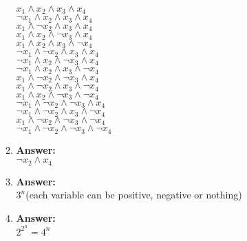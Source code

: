 \documentclass[12pt, fullpage,letterpaper]{article}
\begin{document}
\begin{enumerate}
\begin{enumerate}
\begin{multicols}{3}
$x_1 \wedge x_2 \wedge x_3 \wedge x_4$\\
$\neg x_1 \wedge x_2 \wedge x_3 \wedge x_4$\\
$x_1 \wedge \neg x_2 \wedge x_3 \wedge x_4$\\
$x_1 \wedge x_2 \wedge \neg x_3 \wedge x_4$\\
$x_1 \wedge x_2 \wedge x_3 \wedge \neg x_4$\\
$\neg x_1 \wedge \neg x_2 \wedge x_3 \wedge x_4$\\
$\neg x_1 \wedge x_2 \wedge \neg x_3 \wedge x_4$\\
$\neg x_1 \wedge x_2 \wedge x_3 \wedge \neg x_4$\\
$x_1 \wedge \neg x_2 \wedge \neg x_3 \wedge x_4$\\
$x_1 \wedge \neg x_2 \wedge x_3 \wedge \neg x_4$\\
$x_1 \wedge x_2 \wedge \neg x_3 \wedge \neg x_4$\\
$\neg x_1 \wedge \neg x_2 \wedge \neg x_3 \wedge x_4$\\
$\neg x_1 \wedge \neg x_2 \wedge x_3 \wedge \neg x_4$\\
$x_1 \wedge \neg x_2 \wedge \neg x_3 \wedge \neg x_4$\\
$\neg x_1 \wedge \neg x_2 \wedge \neg x_3 \wedge \neg x_4$\\
\end{multicols}
\item \textbf{Answer:}\\
$\neg x_2 \wedge x_4$
\item \textbf{Answer:}\\
$3^n$(each variable can be positive, negative or nothing)
\item \textbf{Answer:}\\
$2^{2^n}=4^n$
\end{enumerate}


\end{enumerate}
\end{document}
